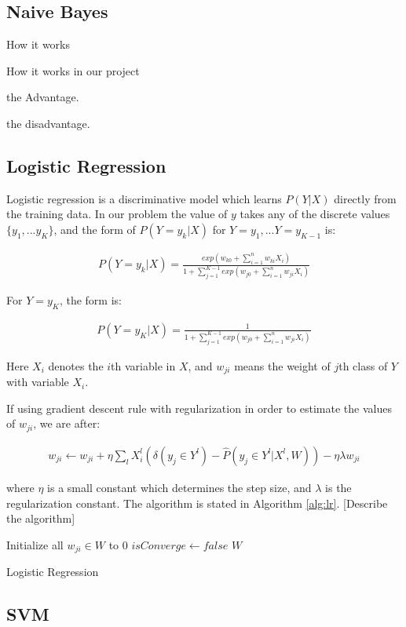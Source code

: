
\subsection{Naive Bayes}
How it works

How it works in our project

the Advantage.

the disadvantage.
\subsection{Logistic Regression}

Logistic regression is a discriminative model which learns $P(Y|X)$ directly from the training data. In our problem the value of $y$ takes any of the discrete values $\{y_1,...y_K\}$, and the form of $P(Y=y_k|X)$ for $Y=y_1,...Y=y_{K-1}$ is: 

\begin{gather}
	P(Y=y_k|X)=\frac{exp(w_{k0}+\sum_{i=1}^n{w_{ki}X_i})}{1+\sum_{j=1}^{K-1}exp(w_{j0}+\sum_{i=1}^n{w_{ji}X_i})}
\end{gather}

For $Y=y_K$, the form is:

\begin{gather}
	P(Y=y_K|X)=\frac{1}{1+\sum_{j=1}^{K-1}exp(w_{j0}+\sum_{i=1}^n{w_{ji}X_i})}
\end{gather}

Here $X_i$ denotes the $i$th variable in $X$, and $w_{ji}$ means the weight of $j$th class of $Y$ with variable $X_i$.

If using gradient descent rule with regularization in order to estimate the values of $w_{ji}$, we are after:

\begin{gather}
	w_{ji} \leftarrow w_{ji}+ \eta \sum_{l}X_{i}^{l}(\delta (y_{j} \in Y^{l})-\hat{P}(y_{j} \in Y^{l}|X^{l},W))- \eta \lambda w_{ji}
\end{gather}

where $\eta$ is a small constant which determines the step size, and $\lambda$ is the regularization constant. The algorithm is stated in Algorithm \ref{alg:lr}. [Describe the algorithm]

\IncMargin{1em}
\begin{algorithm}
\label{alg:lr}
\BlankLine
Initialize all $w_{ji} \in W$ to 0\;
$isConverge \leftarrow false$\;
\Return $W$\;
\caption{Logistic Regression}\label{algo_disjdecomp}
\end{algorithm}\DecMargin{1em}

\subsection{SVM}
